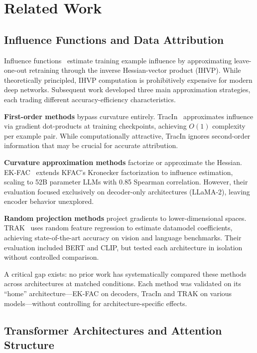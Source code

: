 \section{Related Work}

\subsection{Influence Functions and Data Attribution}

Influence functions~\cite{koh2017understanding} estimate training example influence by approximating leave-one-out retraining through the inverse Hessian-vector product (IHVP). While theoretically principled, IHVP computation is prohibitively expensive for modern deep networks. Subsequent work developed three main approximation strategies, each trading different accuracy-efficiency characteristics.

\textbf{First-order methods} bypass curvature entirely. TracIn~\cite{pruthi2020estimating} approximates influence via gradient dot-products at training checkpoints, achieving $O(1)$ complexity per example pair. While computationally attractive, TracIn ignores second-order information that may be crucial for accurate attribution.

\textbf{Curvature approximation methods} factorize or approximate the Hessian. EK-FAC~\cite{grosse2023studying} extends KFAC's Kronecker factorization to influence estimation, scaling to 52B parameter LLMs with 0.85 Spearman correlation. However, their evaluation focused exclusively on decoder-only architectures (LLaMA-2), leaving encoder behavior unexplored.

\textbf{Random projection methods} project gradients to lower-dimensional spaces. TRAK~\cite{park2023trak} uses random feature regression to estimate datamodel coefficients, achieving state-of-the-art accuracy on vision and language benchmarks. Their evaluation included BERT and CLIP, but tested each architecture in isolation without controlled comparison.

A critical gap exists: no prior work has systematically compared these methods across architectures at matched conditions. Each method was validated on its ``home'' architecture---EK-FAC on decoders, TracIn and TRAK on various models---without controlling for architecture-specific effects.

\subsection{Transformer Architectures and Attention Structure}

